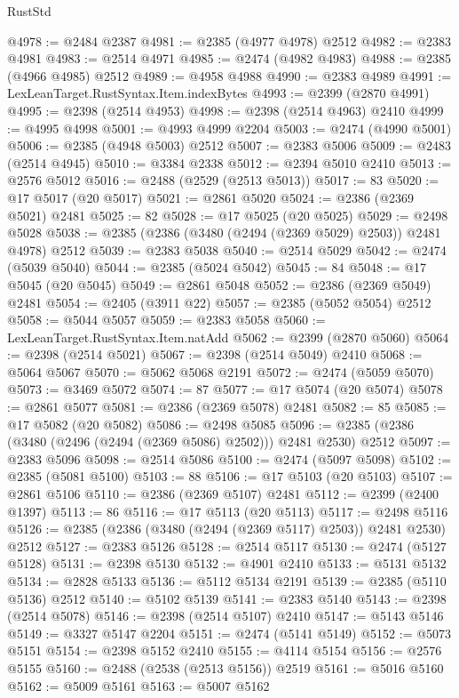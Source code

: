 \begin{lexlean}{RustStd}
\begin{coremodule}
{\begin{coremodule}
{{{{{{{{{{{{{{{{{{{{{{{{{{{{{{{{{{{{{{{{{{{{{{{{{{@4978 := @2484 @2387
@4981 := @2385 (@4977 @4978) @2512
@4982 := @2383 @4981
@4983 := @2514 @4971
@4985 := @2474 (@4982 @4983)
@4988 := @2385 (@4966 @4985) @2512
@4989 := @4958 @4988
@4990 := @2383 @4989
@4991 := LexLeanTarget.RustSyntax.Item.indexBytes
@4993 := @2399 (@2870 @4991)
@4995 := @2398 (@2514 @4953)
@4998 := @2398 (@2514 @4963) @2410
@4999 := @4995 @4998
@5001 := @4993 @4999 @2204
@5003 := @2474 (@4990 @5001)
@5006 := @2385 (@4948 @5003) @2512
@5007 := @2383 @5006
@5009 := @2483 (@2514 @4945)
@5010 := @3384 @2338
@5012 := @2394 @5010 @2410
@5013 := @2576 @5012
@5016 := @2488 (@2529 (@2513 @5013))
@5017 := 83
@5020 := @17 @5017 (@20 @5017)
@5021 := @2861 @5020
@5024 := @2386 (@2369 @5021) @2481
@5025 := 82
@5028 := @17 @5025 (@20 @5025)
@5029 := @2498 @5028
@5038 := @2385 (@2386 (@3480 (@2494 (@2369 @5029) @2503)) @2481 @4978) @2512
@5039 := @2383 @5038
@5040 := @2514 @5029
@5042 := @2474 (@5039 @5040)
@5044 := @2385 (@5024 @5042)
@5045 := 84
@5048 := @17 @5045 (@20 @5045)
@5049 := @2861 @5048
@5052 := @2386 (@2369 @5049) @2481
@5054 := @2405 (@3911 @22)
@5057 := @2385 (@5052 @5054) @2512
@5058 := @5044 @5057
@5059 := @2383 @5058
@5060 := LexLeanTarget.RustSyntax.Item.natAdd
@5062 := @2399 (@2870 @5060)
@5064 := @2398 (@2514 @5021)
@5067 := @2398 (@2514 @5049) @2410
@5068 := @5064 @5067
@5070 := @5062 @5068 @2191
@5072 := @2474 (@5059 @5070)
@5073 := @3469 @5072
@5074 := 87
@5077 := @17 @5074 (@20 @5074)
@5078 := @2861 @5077
@5081 := @2386 (@2369 @5078) @2481
@5082 := 85
@5085 := @17 @5082 (@20 @5082)
@5086 := @2498 @5085
@5096 := @2385 (@2386 (@3480 (@2496 (@2494 (@2369 @5086) @2502))) @2481 @2530) @2512
@5097 := @2383 @5096
@5098 := @2514 @5086
@5100 := @2474 (@5097 @5098)
@5102 := @2385 (@5081 @5100)
@5103 := 88
@5106 := @17 @5103 (@20 @5103)
@5107 := @2861 @5106
@5110 := @2386 (@2369 @5107) @2481
@5112 := @2399 (@2400 @1397)
@5113 := 86
@5116 := @17 @5113 (@20 @5113)
@5117 := @2498 @5116
@5126 := @2385 (@2386 (@3480 (@2494 (@2369 @5117) @2503)) @2481 @2530) @2512
@5127 := @2383 @5126
@5128 := @2514 @5117
@5130 := @2474 (@5127 @5128)
@5131 := @2398 @5130
@5132 := @4901 @2410
@5133 := @5131 @5132
@5134 := @2828 @5133
@5136 := @5112 @5134 @2191
@5139 := @2385 (@5110 @5136) @2512
@5140 := @5102 @5139
@5141 := @2383 @5140
@5143 := @2398 (@2514 @5078)
@5146 := @2398 (@2514 @5107) @2410
@5147 := @5143 @5146
@5149 := @3327 @5147 @2204
@5151 := @2474 (@5141 @5149)
@5152 := @5073 @5151
@5154 := @2398 @5152 @2410
@5155 := @4114 @5154
@5156 := @2576 @5155
@5160 := @2488 (@2538 (@2513 @5156)) @2519
@5161 := @5016 @5160
@5162 := @5009 @5161
@5163 := @5007 @5162
}}}}}}}}}}}}}}}}}}}}}}}}}}}}}}}}}}}}}}}}}}}}}}}}}}
\end{coremodule}}
\end{coremodule}
\end{lexlean}
